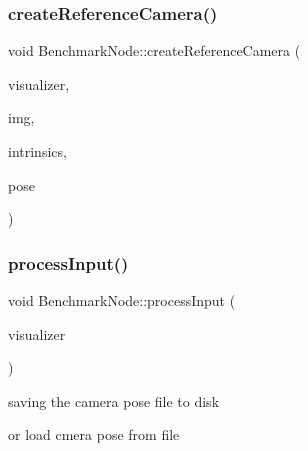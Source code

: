 \subsubsection{\texorpdfstring{create\+Reference\+Camera()}{createReferenceCamera()}}
{\footnotesize\ttfamily void Benchmark\+Node\+::create\+Reference\+Camera (\begin{DoxyParamCaption}\item[{\mbox{\hyperlink{classdvo_1_1visualization_1_1_camera_trajectory_visualizer_interface}{dvo\+::visualization\+::\+Camera\+Trajectory\+Visualizer\+Interface}} $\ast$}]{visualizer,  }\item[{const \mbox{\hyperlink{structdvo_1_1core_1_1_rgbd_image}{dvo\+::core\+::\+Rgbd\+Image}} \&}]{img,  }\item[{const \mbox{\hyperlink{structdvo_1_1core_1_1_intrinsic_matrix}{dvo\+::core\+::\+Intrinsic\+Matrix}} \&}]{intrinsics,  }\item[{const Eigen\+::\+Affine3d \&}]{pose }\end{DoxyParamCaption})}

\mbox{\label{class_benchmark_node_a81ccf22ce05702c97803a502092090f7}} 
\subsubsection{\texorpdfstring{process\+Input()}{processInput()}}
{\footnotesize\ttfamily void Benchmark\+Node\+::process\+Input (\begin{DoxyParamCaption}\item[{\mbox{\hyperlink{classdvo_1_1visualization_1_1_camera_trajectory_visualizer_interface}{dvo\+::visualization\+::\+Camera\+Trajectory\+Visualizer\+Interface}} $\ast$}]{visualizer }\end{DoxyParamCaption})}


\begin{DoxyEnumerate}
\item saving the camera pose file to disk
\item or load cmera pose from file 
\end{DoxyEnumerate}\mbox{\label{class_benchmark_node_aa8ac48849e2165f15af69e561ecb97e6}} 
